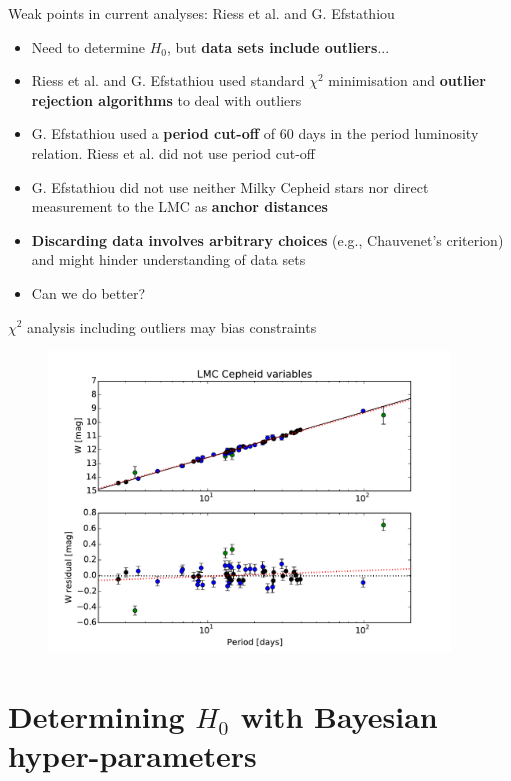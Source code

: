 \documentclass{beamer}
\begin{document}
\begin{frame}{Weak points in current analyses: Riess et al. and G. Efstathiou}
\begin{itemize}
\item Need to determine $H_0$, but \textbf{data sets include outliers}...
\item Riess et al. and G. Efstathiou used standard $\chi^2$ minimisation and \textbf{outlier rejection algorithms} to deal with outliers
\item G. Efstathiou used a \textbf{period cut-off} of $60$ days in the period luminosity relation. Riess et al. did not use period cut-off
\item G. Efstathiou did not use neither Milky Cepheid stars nor direct measurement to the LMC as \textbf{anchor distances}
\item \textbf{Discarding data involves arbitrary choices} (e.g., Chauvenet's criterion) and might hinder understanding of data sets
\item Can we do better? 
\end{itemize}
\end{frame}

\begin{frame}{$\chi^2$ analysis including outliers may bias constraints}
\begin{figure}[hbtp]
\centering
\includegraphics[width=0.95\textwidth]{effective_HP_cepheids_LMC.pdf}
\end{figure}
\end{frame}


\section{Determining $H_0$ with Bayesian hyper-parameters}
\end{document}
